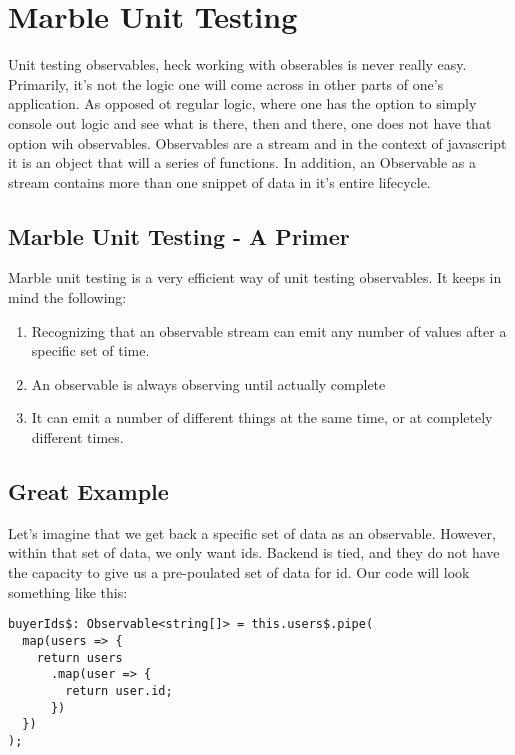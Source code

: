 \maketitle{}
\section{ Marble Unit Testing }

Unit testing observables, heck working with obserables is never really easy.
Primarily, it's not the logic one will come across in other parts of one's
application. As opposed ot regular logic, where one has the option to simply
console out logic and see what is there, then and there, one does not have that
option wih observables. Observables are a stream and in the context of
javascript it is an object that will a series of functions. In addition, an
Observable as a stream contains more than one snippet of data in it's entire
lifecycle.

\subsection{ Marble Unit Testing - A Primer }
Marble unit testing is a very efficient way of unit testing observables. It
keeps in mind the following:
\begin{enumerate}
  \item Recognizing that an observable stream can emit any number of values
  after a specific set of time.
  \item An observable is always observing until actually complete
  \item It can emit a number of different things at the same time, or at
  completely different times.
\end{enumerate}

\subsection{ Great Example }
Let's imagine that we get back a specific set of data as an observable. However,
within that set of data, we only want ids. Backend is tied, and they do not have
the capacity to give us a pre-poulated set of data for id. Our code will look
something like this:
\begin{lstlisting}
buyerIds$: Observable<string[]> = this.users$.pipe(
  map(users => {
    return users
      .map(user => {
        return user.id;
      })
  })
);
\end{lstlisting}

